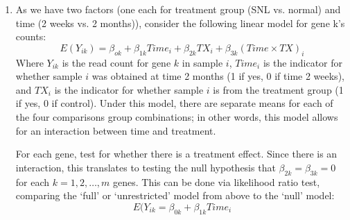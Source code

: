\documentclass[12pt,a4paper]{paper}
\begin{document}
\begin{enumerate}
\begin{enumerate}
\begin{enumerate}
\end{enumerate}
\item As we have two factors (one each for treatment group (SNL vs. normal) and time (2
weeks vs. 2 months)), consider the following linear model for gene k’s counts:
\[E(Y_{ik}) = \beta_{ok} + \beta_{1k}Time_{i} + \beta_{2k}TX_{i}+\beta_{3k}(Time \times TX)_{i}\]
Where $Y_{ik}$ is the read count for gene $k$ in sample $i$, $Time_{i}$ is the indicator for whether sample $i$ was obtained at time 2 months (1 if yes, 0 if time 2 weeks), and $TX_{i}$ is the indicator for whether sample $i$ is from the treatment group (1 if yes, 0 if control). Under this model, there are separate means for each of the four comparisons group combinations; in other words, this model allows for an interaction between time and treatment.

For each gene, test for whether there is a treatment effect. Since there is an interaction, this translates to testing the null hypothesis that $\beta_{2k} = \beta_{3k} = 0$ for each $k = 1,2,\dots,m$ genes. This can be done via likelihood ratio test, comparing the `full' or `unrestricted' model from above to the `null' model:
\[E(Y_{ik} = \beta_{0k} + \beta_{1k}Time_{i}\]


\end{enumerate}
\end{enumerate}
\end{document}
